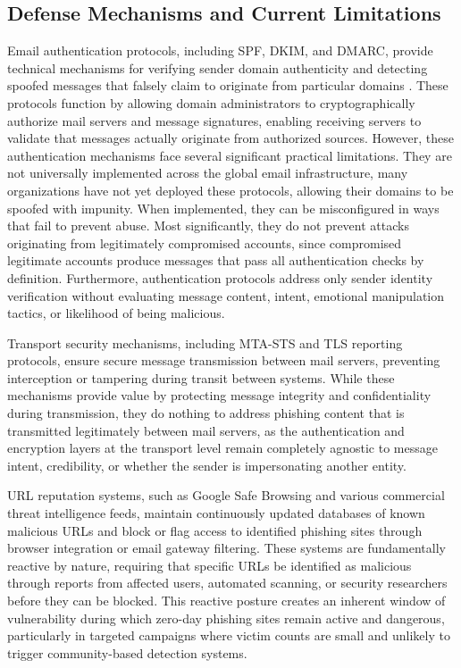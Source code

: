 \subsection{Defense Mechanisms and Current Limitations}

Email authentication protocols, including \ac{SPF}, \ac{DKIM}, and \ac{DMARC}, provide technical mechanisms for verifying sender domain authenticity and detecting spoofed messages that falsely claim to originate from particular domains \cite{DEROUET20165}. These protocols function by allowing domain administrators to cryptographically authorize mail servers and message signatures, enabling receiving servers to validate that messages actually originate from authorized sources. However, these authentication mechanisms face several significant practical limitations. They are not universally implemented across the global email infrastructure, many organizations have not yet deployed these protocols, allowing their domains to be spoofed with impunity. When implemented, they can be misconfigured in ways that fail to prevent abuse. Most significantly, they do not prevent attacks originating from legitimately compromised accounts, since compromised legitimate accounts produce messages that pass all authentication checks by definition. Furthermore, authentication protocols address only sender identity verification without evaluating message content, intent, emotional manipulation tactics, or likelihood of being malicious.

Transport security mechanisms, including \ac{MTA-STS} and \ac{TLS} reporting protocols, ensure secure message transmission between mail servers, preventing interception or tampering during transit between systems. While these mechanisms provide value by protecting message integrity and confidentiality during transmission, they do nothing to address phishing content that is transmitted legitimately between mail servers, as the authentication and encryption layers at the transport level remain completely agnostic to message intent, credibility, or whether the sender is impersonating another entity.

URL reputation systems, such as Google Safe Browsing and various commercial threat intelligence feeds, maintain continuously updated databases of known malicious URLs and block or flag access to identified phishing sites through browser integration or email gateway filtering. These systems are fundamentally reactive by nature, requiring that specific URLs be identified as malicious through reports from affected users, automated scanning, or security researchers before they can be blocked. This reactive posture creates an inherent window of vulnerability during which zero-day phishing sites remain active and dangerous, particularly in targeted campaigns where victim counts are small and unlikely to trigger community-based detection systems.

